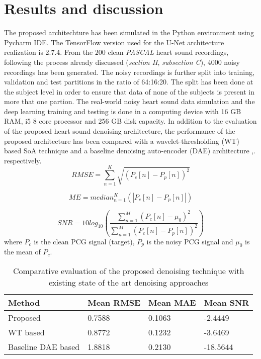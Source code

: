 \documentclass[sigconf,screen]{acmart}
\begin{document}
\section{Results and discussion}
The proposed architechture has been simulated in the Python environment using Pycharm IDE. The TensorFlow version used for the U-Net architecture realization is 2.7.4. From the $200$ clean \textit{PASCAL} heart sound recordings, following the process already discussed (\textit{section II}, \textit{subsection C}), 4000 noisy recordings has been generated. The noisy recordings is further split into training, validation and test partitions in the ratio of 64:16:20. The split has been done at the subject level in order to ensure that data of none of the subjects is present in more that one partion. The real-world noisy heart sound data simulation and the deep learning training and testing is done in a computing device with 16 GB RAM, i5 8 core processor and 256 GB disk capacity. 
In addition to the evaluation of the proposed heart sound denoising architecture, the performance of the proposed architecture has been compared with a wavelet-thresholding (WT) \cite{ghanbari2006new} based SoA technique and a baseline denoising auto-encoder (DAE) architecture \cite{banerjee2022noise},\cite{vincent2008extracting}.  respectively.
\begin{equation}\label{eq:RMSE}
RMSE = \sum_{n=1}^{K}\sqrt{(P_c[n]-P_p[n])^{2}}
\end{equation}

\begin{equation}\label{eq:ME}
    ME = median_{n=1}^{K}(|P_c[n]-P_p[n]|)
\end{equation}

\begin{equation}\label{eq:SNR}
SNR = 10log_{10}(\frac{\sum_{n=1}^{M}(P_c[n]-\mu_0)^{2}}{\sum_{n=1}^{M}(P_c[n]-P_p[n])^{2}})
\end{equation}
where $P_c$ is the clean PCG signal (target), $P_p$ is the noisy PCG signal and $\mu_{0}$ is the mean of $P_c$.

\begin{table}[]
	\caption{Comparative evaluation of the proposed denoising technique with existing state of the art denoising approaches}
	\label{performance}\centering
\begin{tabular}{p{3cm}p{1.25cm}p{1.25cm}p{1.25cm}}\hline
                               Method               & Mean RMSE & Mean MAE & Mean SNR      \\ \hline  
Proposed                    & 0.7588                            & 0.1063       & -2.4449  \\ \hline  
WT based            & 0.8772                            & 0.1232       & -3.6469  \\ \hline  
Baseline DAE based  & 1.8818                            & 0.2130       & -18.5644 \\ \hline  
\end{tabular}
\end{table}
\end{document}

